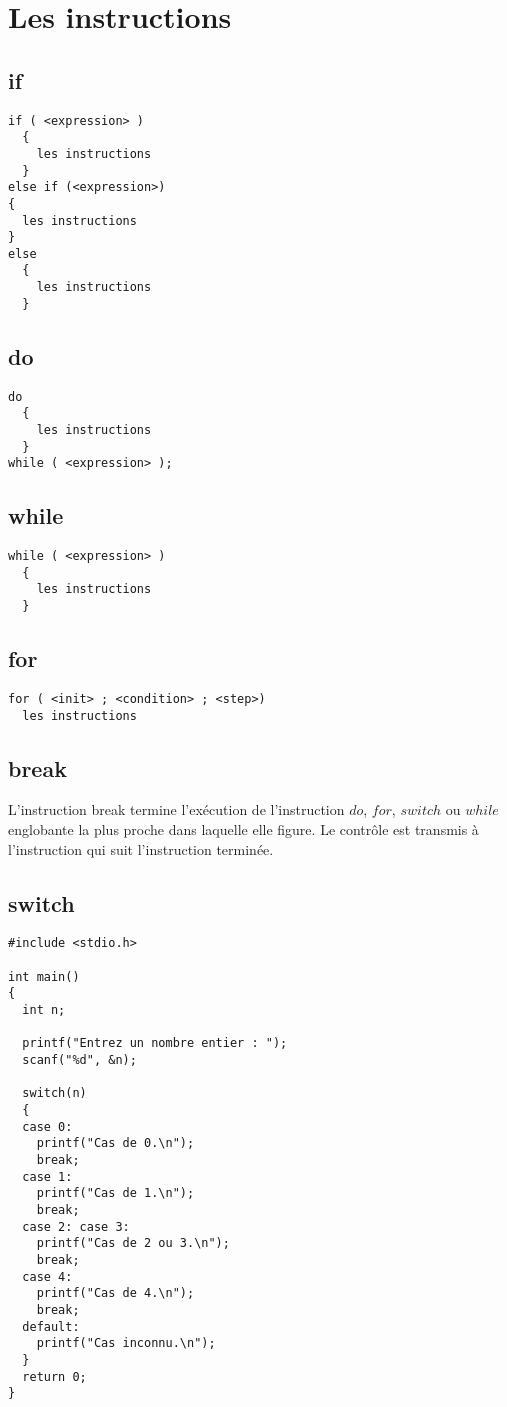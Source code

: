 \documentclass[a4paper]{article}
\begin{document}
\section{Les instructions}
\subsection{if}
\begin{lstlisting}
if ( <expression> )
  {
    les instructions
  }
else if (<expression>)
{
  les instructions
}
else
  {
    les instructions
  }
\end{lstlisting}
\subsection{do}
\begin{lstlisting}
do
  {
    les instructions
  }
while ( <expression> );
\end{lstlisting}
\subsection{while}
\begin{lstlisting}
while ( <expression> )
  {
    les instructions
  }
\end{lstlisting}
\subsection{for}
\begin{lstlisting}
for ( <init> ; <condition> ; <step>)
  les instructions
\end{lstlisting}
\subsection{break}
L'instruction break termine l'exécution de l'instruction $do$, $for$, $switch$ ou $while$ englobante la plus proche dans laquelle elle figure. Le contrôle est transmis à l'instruction qui suit l'instruction terminée.\subsection{switch}
\begin{lstlisting}
#include <stdio.h>

int main()
{
  int n;

  printf("Entrez un nombre entier : ");
  scanf("%d", &n);

  switch(n)
  {
  case 0:
    printf("Cas de 0.\n");
    break;
  case 1:
    printf("Cas de 1.\n");
    break;
  case 2: case 3:
    printf("Cas de 2 ou 3.\n");
    break;
  case 4:
    printf("Cas de 4.\n");
    break;
  default:
    printf("Cas inconnu.\n");
  }
  return 0;
}
\end{lstlisting}
\end{document}
